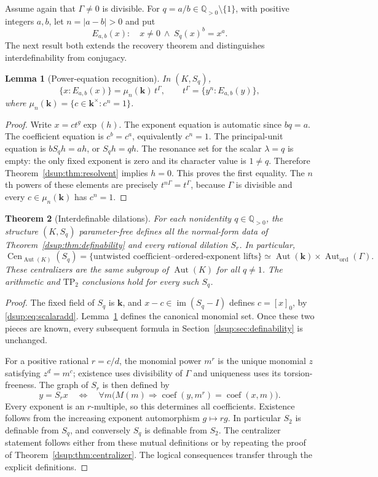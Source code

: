 \documentclass[11pt,oneside]{article}
\numberwithin{equation}{section}
\newtheorem{theorem}{Theorem}[section]
\newtheorem{lemma}[theorem]{Lemma}
\theoremstyle{definition}
\theoremstyle{remark}
\newcommand{\Q}{\mathbb Q}
\newcommand{\kk}{\mathbf k}
\newcommand{\Aut}{\operatorname{Aut}}
\newcommand{\im}{\operatorname{im}}
\newcommand{\coef}{\operatorname{coef}}
\DeclareMathOperator{\Cen}{Cen}
\begin{document}
Assume again that $\Gamma\ne0$ is divisible. For
$q=a/b\in\Q_{>0}\setminus\{1\}$, with positive integers $a,b$, let
$n=|a-b|>0$ and put
\[
 E_{a,b}(x):\quad x\ne0\ \land\ S_q(x)^b=x^a.
\]
The next result both extends the recovery theorem and distinguishes
interdefinability from conjugacy.

\begin{lemma}[Power-equation recognition]\label{dsup:lem:rationalrecognition}
In $(K,S_q)$,
\[
 \{x:E_{a,b}(x)\}=\mu_n(\kk)\,t^\Gamma,
 \qquad
 t^\Gamma=\{y^n:E_{a,b}(y)\},
\]
where $\mu_n(\kk)=\{c\in\kk^\times:c^n=1\}$.
\end{lemma}
\begin{proof}
Write $x=ct^g\exp(h)$. The exponent equation is automatic since
$bq=a$. The coefficient equation is $c^b=c^a$, equivalently $c^n=1$.
The principal-unit equation is $bS_qh=ah$, or $S_qh=qh$.
The resonance set for the scalar $\lambda=q$ is empty: the only fixed
exponent is zero and its character value is $1\ne q$. Therefore
Theorem~\ref{dsup:thm:resolvent} implies $h=0$. This proves the first equality.
The $n$th powers of these elements are precisely $t^{n\Gamma}=t^\Gamma$,
because $\Gamma$ is divisible and every $c\in\mu_n(\kk)$ has $c^n=1$.
\end{proof}

\begin{theorem}[Interdefinable dilations]\label{dsup:thm:rationaldef}
For each nonidentity $q\in\Q_{>0}$, the structure $(K,S_q)$ parameter-free
defines all the normal-form data of Theorem~\ref{dsup:thm:definability} and
every rational dilation $S_r$. In particular,
\[
 \Cen_{\Aut(K)}(S_q)
 =\{\text{untwisted coefficient--ordered-exponent lifts}\}
 \simeq\Aut(\kk)\times\Aut_{\mathrm{ord}}(\Gamma).
\]
These centralizers are the same subgroup of $\Aut(K)$ for all $q\ne1$.
The arithmetic and $\mathrm{TP}_2$ conclusions hold for every such $S_q$.
\end{theorem}
\begin{proof}
The fixed field of $S_q$ is $\kk$, and
$x-c\in\im(S_q-I)$ defines $c=[x]_0$, by
\eqref{dsup:eq:scalaradd}. Lemma~\ref{dsup:lem:rationalrecognition} defines the
canonical monomial set. Once these two pieces are known, every subsequent
formula in Section~\ref{dsup:sec:definability} is unchanged.

For a positive rational $r=c/d$, the monomial power $m^r$ is the unique
monomial $z$ satisfying $z^d=m^c$; existence uses divisibility of
$\Gamma$ and uniqueness uses its torsion-freeness. The graph of $S_r$ is
then defined by
\[
 y=S_rx\quad\Longleftrightarrow\quad
 \forall m\bigl(M(m)\Rightarrow
       \coef(y,m^r)=\coef(x,m)\bigr).
\]
Every exponent is an $r$-multiple, so this determines all coefficients.
Existence follows from the increasing exponent automorphism $g\mapsto rg$.
In particular $S_2$ is definable from $S_q$, and conversely $S_q$ is
definable from $S_2$. The centralizer statement follows either from these
mutual definitions or by repeating the proof of
Theorem~\ref{dsup:thm:centralizer}. The logical consequences transfer through
the explicit definitions.
\end{proof}
\end{document}
